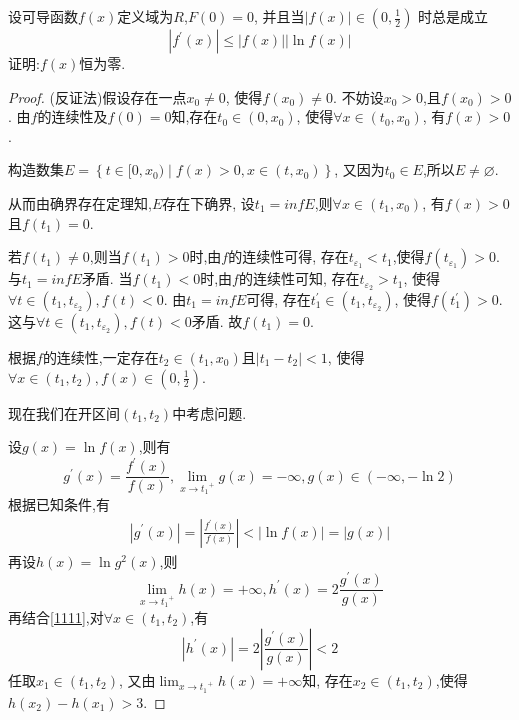 \documentclass[../../main.tex]{subfiles}%
\begin{document}
\begin{example}
设可导函数$f(x)$定义域为$R$,$F(0)=0$,
并且当$\left| f\left( x \right) \right|\in \left( 0,\frac{1}{2} \right) $
时总是成立
\begin{equation}
\left| f^{\prime}\left( x \right) \right|\leqslant \left| f\left( x \right) \right|\left| \ln f\left( x \right) \right|
\nonumber
\end{equation}
证明:$f(x)$恒为零.
\end{example}
\begin{proof}
(反证法)假设存在一点$x_0\ne 0$,
使得$f(x_0)\ne 0$.
不妨设$x_0> 0$,且$f(x_0)>0$.
由$f$的连续性及$f(0)=0$知,存在$t_0\in(0,x_0)$,
使得$\forall x\in(t_0,x_0)$,
有$f(x)>0$.

构造数集$E=\left\{ t\in [0,x_0)\mid f\left( x \right) >0,x\in \left( t,x_0 \right) \right\} $,
又因为$t_0\in E$,所以$E \ne \varnothing $.

从而由确界存在定理知,$E$存在下确界,
设$t_1=inf E$,则$\forall x\in (t_1,x_0)$,
有$f(x)>0$且$f(t_1)=0$.

若$f(t_1)\ne 0$,则当$f(t_1)>0$时,由$f$的连续性可得,
存在$t_{\varepsilon_1}<t_1$,使得$f(t_{\varepsilon_1})>0$.
与$t_1=inf E$矛盾.
当$f(t_1)<0$时,由$f$的连续性可知,
存在$t_{\varepsilon_2}>t_1$,
使得$\forall t\in(t_1,t_{\varepsilon_2}),f(t)<0$.
由$t_1=inf E$可得,
存在$t_1^{\prime}\in (t_1,t_{\varepsilon_2})$,
使得$f(t_1^{\prime})>0$.这与$\forall t\in(t_1,t_{\varepsilon_2}),f(t)<0$矛盾.
故$f(t_1)=0$.

根据$f$的连续性,一定存在$t_2\in(t_1,x_0)$且$\left| t_1-t_2 \right|<1$,
使得$\forall x\in (t_1,t_2),f(x)\in(0,\frac{1}{2})$.

现在我们在开区间$(t_1,t_2)$中考虑问题.

设$g(x)=\ln f(x)$,则有
\begin{equation}
g^{\prime}(x)=\frac{f^{\prime}(x)}{f(x)}
,\lim_{x\rightarrow {t_1}^{+}} g\left( x \right) =-\infty ,g\left( x \right) \in \left( -\infty ,-\ln 2 \right) 
\nonumber
\end{equation}
根据已知条件,有
\begin{equation}\label{1111}
\begin{split}
\left| g^{\prime}\left( x \right) \right|=\left| \frac{f^{\prime}\left( x \right)}{f\left( x \right)} \right|<\left| \ln f\left( x \right) \right|=\left| g\left( x \right) \right|
\end{split}
\end{equation}
再设$h(x)=\ln g^2(x)$,则
\begin{equation}
\lim_{x\rightarrow {t_1}^{+}} h\left( x \right) =+\infty
,h^{\prime}(x)=2\frac{g^{\prime}(x)}{g(x)}
\nonumber
\end{equation}
再结合\eqref{1111},对$\forall x\in(t_1,t_2)$,有
\begin{equation}
\left| h^{\prime}(x) \right|=2\left| \frac{g^{\prime}(x)}{g(x)} \right|<2
\nonumber
\end{equation}
任取$x_1\in(t_1,t_2)$,
又由$\lim_{x\rightarrow {t_1}^{+}} h\left( x \right) =+\infty$知,
存在$x_2\in (t_1,t_2)$,使得$h(x_2)-h(x_1)>3$.


\end{proof}
\end{document}
